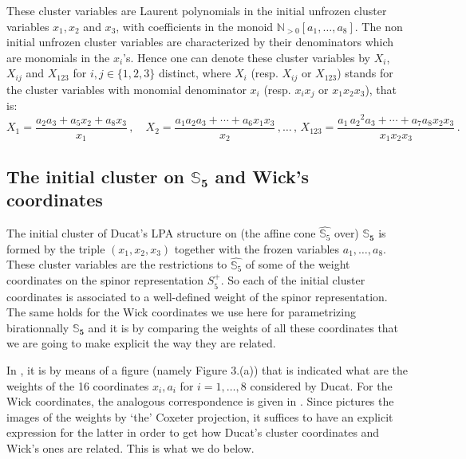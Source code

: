 \documentclass[11pt]{amsart}
\newcommand{\mk}{\medskip}
\begin{document}
These cluster variables are Laurent polynomials in the initial unfrozen cluster variables $x_1,x_2$ and $x_3$, with coefficients in the monoid $\mathbb N_{>0}[a_1,\ldots,a_8]$. The non initial unfrozen cluster variables are characterized by their denominators which are monomials in the $x_i$'s. Hence one can denote these cluster variables by $X_i$, $X_{ij}$ and $X_{123}$ for $i,j\in \{1,2,3\}$ distinct, where $X_i$ (resp. $X_{ij}$ or $X_{123}$) stands for the cluster variables with monomial denominator $x_i$ (resp. $x_{i}x_j$ or $x_1x_2x_3$), that is: 
$$  X_1 = \frac{\mathit{a_2} \mathit{a_3} +\mathit{a_5} \mathit{x_2} +\mathit{a_8} \mathit{x_3}}{\mathit{x_1}} \, , \quad 
X_2 = 
\frac{\mathit{a_1} \mathit{a_2} \mathit{a_3} +\cdots+\mathit{a_6} \mathit{x_1} \mathit{x_3}}{\mathit{x_2}}
\, , \ldots 
 \,  , \, 
X_{123} =  
\frac{\mathit{a_1} \,\mathit{a_2}^{2} \mathit{a_3} +\cdots+\mathit{a_7} \mathit{a_8} \mathit{x_2} \mathit{x_3}}{\mathit{x_1} \mathit{x_2} \mathit{x_3}}
\, . 
$$







\subsection{\bf The initial cluster on $\boldsymbol{\mathbb S_5}$ and Wick's coordinates}
The initial cluster of Ducat's LPA structure on  (the affine cone $\widehat{\boldsymbol{\mathbb S}_5}$ over) $\boldsymbol{\mathbb S_5}$ is formed by the 
 triple $(x_1,x_2,x_3)$ together with the frozen variables $a_1,\ldots,a_8$.  These cluster variables are the restrictions to $\widehat{\boldsymbol{\mathbb S}_5}$ of some of the weight coordinates on the spinor representation $S^+_5$. So each of the initial cluster coordinates is associated to a well-defined weight of the spinor representation.  The same holds for the Wick coordinates we use here for  parametrizing birationnally $\boldsymbol{\mathbb S_5}$ and it is by comparing the weights of all these coordinates that we are going to make explicit the way they are related. 
 \mk 
 
 
 In \cite{DaiseyDucat}, it is by means of a figure (namely Figure 3.(a)) that is indicated 
 what are the weights of  the 16 coordinates  $x_i,a_i$ for $i=1,\ldots,8$ considered by Ducat. 
 For the Wick coordinates, the analogous correspondence is given in  \cite[Table\,4.1]{PirioAFST}.
Since \cite[Figure 3.(a)]{DaiseyDucat} pictures the images of the weights by `the' Coxeter projection, it suffices to have an explicit expression for the latter in order to get how Ducat's cluster coordinates and Wick's ones are related. This is what we do below. 
  
\end{document}
